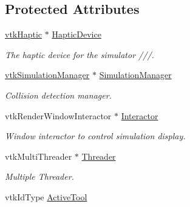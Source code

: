 \subsection*{Protected Attributes}
\begin{DoxyCompactItemize}
\item 
\hypertarget{classvtkSimulation_aa2472aa6e93b91690a35f4675e8dab43}{
\hyperlink{classvtkHaptic}{vtkHaptic} $\ast$ \hyperlink{classvtkSimulation_aa2472aa6e93b91690a35f4675e8dab43}{HapticDevice}}
\label{classvtkSimulation_aa2472aa6e93b91690a35f4675e8dab43}

\begin{DoxyCompactList}\small\item\em The haptic device for the simulator ///. \item\end{DoxyCompactList}\item 
\hypertarget{classvtkSimulation_ae8b90fb911d026f5ad94715073db740f}{
\hyperlink{classvtkSimulationManager}{vtkSimulationManager} $\ast$ \hyperlink{classvtkSimulation_ae8b90fb911d026f5ad94715073db740f}{SimulationManager}}
\label{classvtkSimulation_ae8b90fb911d026f5ad94715073db740f}

\begin{DoxyCompactList}\small\item\em Collision detection manager. \item\end{DoxyCompactList}\item 
\hypertarget{classvtkSimulation_a14344fc57758eb7b744abff156e0fb25}{
vtkRenderWindowInteractor $\ast$ \hyperlink{classvtkSimulation_a14344fc57758eb7b744abff156e0fb25}{Interactor}}
\label{classvtkSimulation_a14344fc57758eb7b744abff156e0fb25}

\begin{DoxyCompactList}\small\item\em Window interactor to control simulation display. \item\end{DoxyCompactList}\item 
\hypertarget{classvtkSimulation_af8d8d5df4ce87a773be0145fda791215}{
vtkMultiThreader $\ast$ \hyperlink{classvtkSimulation_af8d8d5df4ce87a773be0145fda791215}{Threader}}
\label{classvtkSimulation_af8d8d5df4ce87a773be0145fda791215}

\begin{DoxyCompactList}\small\item\em Multiple Threader. \item\end{DoxyCompactList}\item 
\hypertarget{classvtkSimulation_a6c6c63b3c756e8622b565584879472a0}{
vtkIdType \hyperlink{classvtkSimulation_a6c6c63b3c756e8622b565584879472a0}{ActiveTool}}
\label{classvtkSimulation_a6c6c63b3c756e8622b565584879472a0}


\end{DoxyCompactItemize}
